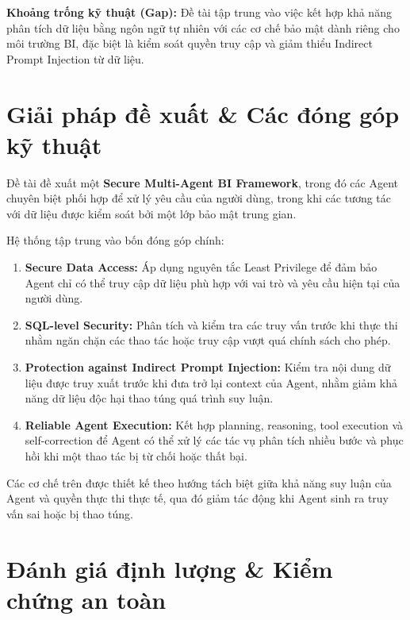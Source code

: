 \noindent\textbf{Khoảng trống kỹ thuật (Gap):} Đề tài tập trung vào việc kết hợp khả năng phân tích dữ liệu bằng ngôn ngữ tự nhiên với các cơ chế bảo mật dành riêng cho môi trường BI, đặc biệt là kiểm soát quyền truy cập và giảm thiểu Indirect Prompt Injection từ dữ liệu.

\section{Giải pháp đề xuất \& Các đóng góp kỹ thuật}

Đề tài đề xuất một \textbf{Secure Multi-Agent BI Framework}, trong đó các Agent chuyên biệt phối hợp để xử lý yêu cầu của người dùng, trong khi các tương tác với dữ liệu được kiểm soát bởi một lớp bảo mật trung gian.

Hệ thống tập trung vào bốn đóng góp chính:

\begin{enumerate}
\item \textbf{Secure Data Access:} Áp dụng nguyên tắc Least Privilege để đảm bảo Agent chỉ có thể truy cập dữ liệu phù hợp với vai trò và yêu cầu hiện tại của người dùng.

\item \textbf{SQL-level Security:} Phân tích và kiểm tra các truy vấn trước khi thực thi nhằm ngăn chặn các thao tác hoặc truy cập vượt quá chính sách cho phép.

\item \textbf{Protection against Indirect Prompt Injection:} Kiểm tra nội dung dữ liệu được truy xuất trước khi đưa trở lại context của Agent, nhằm giảm khả năng dữ liệu độc hại thao túng quá trình suy luận.

\item \textbf{Reliable Agent Execution:} Kết hợp planning, reasoning, tool execution và self-correction để Agent có thể xử lý các tác vụ phân tích nhiều bước và phục hồi khi một thao tác bị từ chối hoặc thất bại.

\end{enumerate}

Các cơ chế trên được thiết kế theo hướng tách biệt giữa khả năng suy luận của Agent và quyền thực thi thực tế, qua đó giảm tác động khi Agent sinh ra truy vấn sai hoặc bị thao túng.

\section{Đánh giá định lượng \& Kiểm chứng an toàn}

